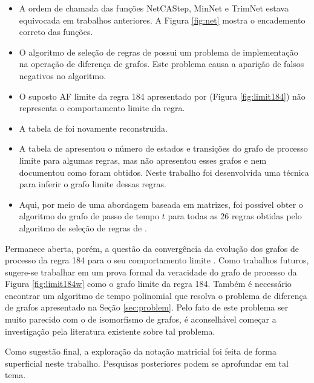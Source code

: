 \documentclass[12pt,a4paper]{article}
\begin{document}
\begin{itemize}
\item A ordem de chamada das funções NetCAStep, MinNet e TrimNet estava
equivocada em trabalhos anteriores. A Figura \ref{fig:net} mostra o
encademento correto das funções.

\item O algoritmo de seleção de regras de  possui
um problema de implementação na operação de diferença de grafos. Este
problema causa a aparição de falsos negativos no algoritmo.

\item O suposto AF limite da regra 184 apresentado por 
(Figura \ref{fig:limit184}) não representa o comportamento limite da regra.

\item A tabela de  foi novamente reconstruída.

\item A tabela de  apresentou o número de estados
e transições do grafo de processo limite para algumas regras, mas não
apresentou esses grafos e nem documentou como foram obtidos. Neste trabalho
foi desenvolvida uma técnica para inferir o grafo limite dessas regras.

\item Aqui, por meio de uma abordagem baseada em matrizes, foi possível
obter o algoritmo do grafo de passo de tempo $t$ para todas as 26 regras
obtidas pelo algoritmo de seleção de regras de .
\end{itemize}

Permanece aberta, porém, a questão da convergência da evolução dos grafos
de processo da regra 184 para o seu comportamento limite .
Como trabalhos futuros, sugere-se trabalhar em um prova formal da veracidade
do grafo de processo da Figura \ref{fig:limit184w} como o grafo limite da regra
184. Também é necessário encontrar um algoritmo de tempo polinomial que resolva
o problema de diferença de grafos apresentado na Seção \ref{sec:problem}.
Pelo fato de este problema ser muito parecido com o de isomorfismo de grafos,
é aconselhável começar a investigação pela literatura existente sobre tal
problema.

Como sugestão final, a exploração da notação matricial foi feita de forma
superficial neste trabalho.  Pesquisas posteriores podem se aprofundar em
tal tema.

\newpage
\end{document}
